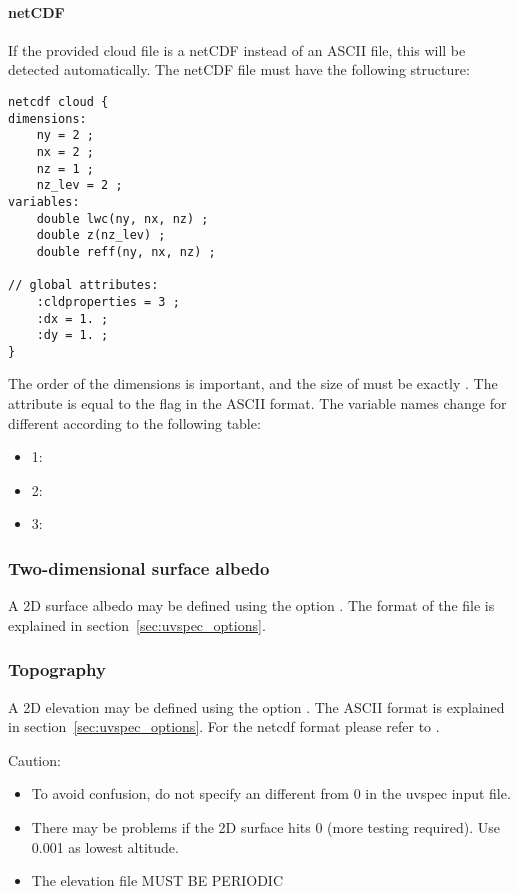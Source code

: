 {\paragraph{netCDF}
If the provided cloud file is a netCDF instead of an ASCII file, this will be
detected automatically. The netCDF file must have the following structure:
\begin{Verbatim}[fontsize=\footnotesize, frame=single, samepage=true]
netcdf cloud {
dimensions:
	ny = 2 ;
	nx = 2 ;
	nz = 1 ;
	nz_lev = 2 ;
variables:
	double lwc(ny, nx, nz) ;
	double z(nz_lev) ;
	double reff(ny, nx, nz) ;

// global attributes:
	:cldproperties = 3 ;
	:dx = 1. ;
	:dy = 1. ;
}
\end{Verbatim}
The order of the dimensions is important, and the size of  must be
exactly . The  attribute is equal to the flag
in the ASCII format. The variable names change for different 
according to the following table:
\begin{itemize}
    \item{1: \quad {}}
    \item{2: \quad {}}
    \item{3: \quad {}}
\end{itemize}

\subsubsection{Two-dimensional surface albedo}

A 2D surface albedo may be defined using the option
. The format of the file is explained in
section~\ref{sec:uvspec_options}. 

\subsubsection{Topography}

A 2D elevation may be defined using the option 
. The ASCII format is explained in
section~\ref{sec:uvspec_options}. For the netcdf format please refer
to . 

Caution:
\begin{itemize}
\item To avoid confusion, do not specify an  different
  from 0 in the uvspec input file.
\item There may be problems if the 2D surface hits 0 
  (more testing required). Use 0.001 as lowest altitude.
\item  The elevation file MUST BE PERIODIC
\end{itemize}

}
